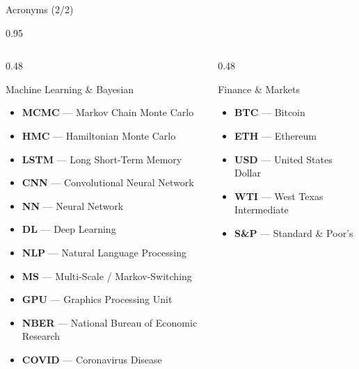 \documentclass[9pt, aspectratio=169, t]{beamer}
\begin{document}
\begin{frame}{Acronyms (2/2)}
    \begin{cminipage}{0.95\textwidth}
    {\scriptsize
    \begin{columns}[T]
        \begin{column}{0.48\textwidth}
            \begin{block}{Machine Learning \& Bayesian}
                \begin{itemize}\setlength{\itemsep}{0pt}
                    \item \textbf{MCMC} --- Markov Chain Monte Carlo
                    \item \textbf{HMC} --- Hamiltonian Monte Carlo
                    \item \textbf{LSTM} --- Long Short-Term Memory
                    \item \textbf{CNN} --- Convolutional Neural Network
                    \item \textbf{NN} --- Neural Network
                    \item \textbf{DL} --- Deep Learning
                    \item \textbf{NLP} --- Natural Language Processing
                    \item \textbf{MS} --- Multi-Scale / Markov-Switching
                    \item \textbf{GPU} --- Graphics Processing Unit
                    \item \textbf{NBER} --- National Bureau of Economic Research
                    \item \textbf{COVID} --- Coronavirus Disease
                \end{itemize}
            \end{block}
        \end{column}
        \begin{column}{0.48\textwidth}
            \begin{alertblock}{Finance \& Markets}
                \begin{itemize}\setlength{\itemsep}{0pt}
                    \item \textbf{BTC} --- Bitcoin
                    \item \textbf{ETH} --- Ethereum
                    \item \textbf{USD} --- United States Dollar
                    \item \textbf{WTI} --- West Texas Intermediate
                    \item \textbf{S\&P} --- Standard \& Poor's

\end{itemize}
\end{alertblock}
\end{column}
\end{columns}}
\end{cminipage}
\end{frame}
\end{document}
